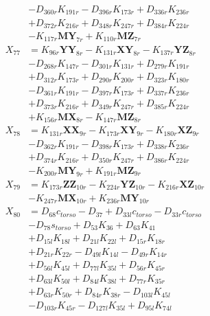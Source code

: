 \begin{multicols}{2}
\begin{align}
&- D_{360r}K_{191r} - D_{396r}K_{173r} + D_{336r}K_{236r}  \nonumber \\
&+ D_{372r}K_{216r} + D_{348r}K_{247r} + D_{384r}K_{224r}  \nonumber \\
&- K_{117r}\mathbf{MY}_{7r} + K_{110r}\mathbf{MZ}_{7r} \nonumber \\
X_{77} &= K_{96r}\mathbf{YY}_{8r} - K_{131r}\mathbf{XY}_{8r} - K_{137r}\mathbf{YZ}_{8r}  \nonumber \\
&- D_{268r}K_{147r} - D_{301r}K_{131r} + D_{279r}K_{191r}  \nonumber \\
&+ D_{312r}K_{173r} + D_{290r}K_{200r} + D_{323r}K_{180r}  \nonumber \\
&- D_{361r}K_{191r} - D_{397r}K_{173r} + D_{337r}K_{236r}  \nonumber \\
&+ D_{373r}K_{216r} + D_{349r}K_{247r} + D_{385r}K_{224r}  \nonumber \\
&+ K_{156r}\mathbf{MX}_{8r} - K_{147r}\mathbf{MZ}_{8r} \nonumber \\
X_{78} &= K_{131r}\mathbf{XX}_{9r} - K_{173r}\mathbf{XY}_{9r} - K_{180r}\mathbf{XZ}_{9r}  \nonumber \\
&- D_{362r}K_{191r} - D_{398r}K_{173r} + D_{338r}K_{236r}  \nonumber \\
&+ D_{374r}K_{216r} + D_{350r}K_{247r} + D_{386r}K_{224r}  \nonumber \\
&- K_{200r}\mathbf{MY}_{9r} + K_{191r}\mathbf{MZ}_{9r} \nonumber \\
X_{79} &= K_{173r}\mathbf{ZZ}_{10r} - K_{224r}\mathbf{YZ}_{10r} - K_{216r}\mathbf{XZ}_{10r}  \nonumber \\
&- K_{247r}\mathbf{MX}_{10r} + K_{236r}\mathbf{MY}_{10r} \nonumber \\
X_{80} &= D_{68}c_{torso} - D_{37} + D_{33l}c_{torso} - D_{33r}c_{torso}  \nonumber \\
&- D_{78}s_{torso} + D_{53}K_{36} + D_{63}K_{41}  \nonumber \\
&+ D_{15l}K_{18l} + D_{21l}K_{22l} + D_{15r}K_{18r}  \nonumber \\
&+ D_{21r}K_{22r} - D_{49l}K_{14l} - D_{49r}K_{14r}  \nonumber \\
&+ D_{56l}K_{45l} + D_{77l}K_{35l} + D_{56r}K_{45r}  \nonumber \\
&+ D_{63l}K_{50l} + D_{84l}K_{38l} + D_{77r}K_{35r}  \nonumber \\
&+ D_{63r}K_{50r} + D_{84r}K_{38r} - D_{103l}K_{45l}  \nonumber \\
&- D_{103r}K_{45r} - D_{127l}K_{35l} + D_{95l}K_{74l}  \nonumber \\

\end{align}
\end{multicols}

